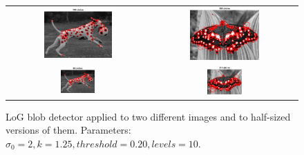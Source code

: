 \begin{figure}[h]
	\centering
	\begin{tabular}{cc}
		\includegraphics[width=0.5\textwidth]{figures/a3_dalmation_k020_full.png} &
		\includegraphics[width=0.5\textwidth]{figures/a3_butterfly_k020.png} \\
		\includegraphics[width=0.25\textwidth]{figures/a3_dalmation_k020_half.png} &
		\includegraphics[width=0.25\textwidth]{figures/a3_butterfly_k020_small.png} \\
	\end{tabular}
	\caption{LoG blob detector applied to two different images and to half-sized versions of them. Parameters: $\sigma_0=2, k=1.25, threshold=0.20, levels=10$.}
	\label{fig:a3:thresholds}
\end{figure}


